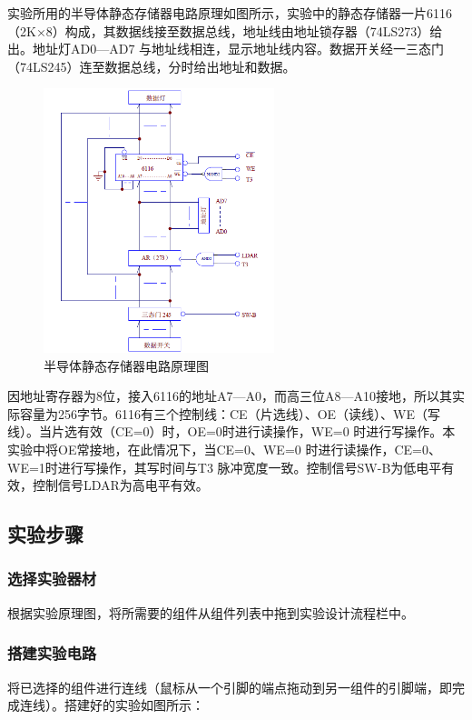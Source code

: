 \documentclass[UTF8,12pt]{article}
\begin{document}
实验所用的半导体静态存储器电路原理如图所示，实验中的静态存储器一片6116（2K×8）构成，其数据线接至数据总线，地址线由地址锁存器（74LS273）给出。地址灯AD0—AD7 与地址线相连，显示地址线内容。数据开关经一三态门（74LS245）连至数据总线，分时给出地址和数据。

\begin{figure}[htbp]
    \centering
    \includegraphics[width=0.6\textwidth]{img/15.png}
    \caption{半导体静态存储器电路原理图}
\end{figure}

因地址寄存器为8位，接入6116的地址A7—A0，而高三位A8—A10接地，所以其实际容量为256字节。6116有三个控制线：CE（片选线）、OE（读线）、WE（写线）。当片选有效（CE=0）时，OE=0时进行读操作，WE=0 时进行写操作。本实验中将OE常接地，在此情况下，当CE=0、WE=0 时进行读操作，CE=0、WE=1时进行写操作，其写时间与T3 脉冲宽度一致。控制信号SW-B为低电平有效，控制信号LDAR为高电平有效。

\subsection{实验步骤}
\subsubsection{选择实验器材}
根据实验原理图，将所需要的组件从组件列表中拖到实验设计流程栏中。

\subsubsection{搭建实验电路}
将已选择的组件进行连线（鼠标从一个引脚的端点拖动到另一组件的引脚端，即完成连线）。搭建好的实验如图所示：
\end{document}
